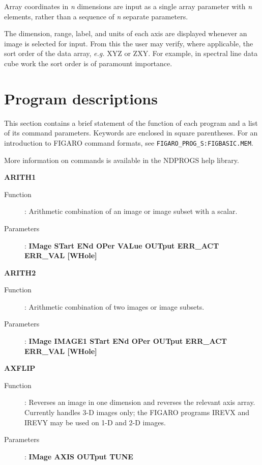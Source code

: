 Array coordinates in {\it n} dimensions are input as a single array parameter 
with {\it n} elements, rather than a sequence of {\it n} separate parameters.

The dimension, range, label, and units of each axis are displayed whenever an 
image is selected for input. From this the user may verify, where applicable, 
the sort order of the data array, {\it e.g.} XYZ or ZXY. For example, in 
spectral line data cube work the sort order is of paramount importance.

\section{Program descriptions}

This section contains a brief statement of the function of each program and a 
list of its command parameters. Keywords are enclosed in square parentheses. 
For an introduction to FIGARO command formats, see 
{\tt FIGARO\_PROG\_S:FIGBASIC.MEM}.

More information on commands is available in the NDPROGS help library.
\vspace{5mm}

{\large\bf ARITH1 \hfill}
\begin{description}
\item[Function]: 
Arithmetic combination of an image or image subset with a scalar.
\item[Parameters]: 
{\bf IMage STart ENd OPer VALue OUTput ERR\_ACT ERR\_VAL [WHole]}
\end{description}
\vspace{5mm}

{\large\bf ARITH2 \hfill}
\begin{description}
\item[Function]: 
Arithmetic combination of two images or image subsets.
\item[Parameters]: 
{\bf IMage IMAGE1 STart ENd OPer OUTput ERR\_ACT ERR\_VAL [WHole]}
\end{description}
\vspace{5mm}

{\large\bf AXFLIP \hfill}
\begin{description}
\item[Function]: 
Reverses an image in one dimension and reverses the relevant axis array. 
Currently handles 3-D images only; the FIGARO programs IREVX and IREVY may be 
used on 1-D and 2-D images.
\item[Parameters]: 
{\bf IMage AXIS OUTput TUNE}
\end{description}
\vspace{5mm}

